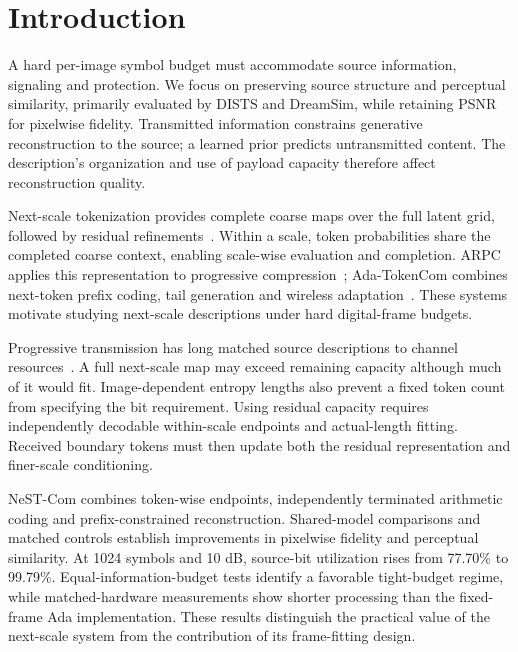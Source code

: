 \section{Introduction}
A hard per-image symbol budget must accommodate source information, signaling and protection. We focus on preserving source structure and perceptual similarity, primarily evaluated by DISTS and DreamSim, while retaining PSNR for pixelwise fidelity. Transmitted information constrains generative reconstruction to the source; a learned prior predicts untransmitted content. The description's organization and use of payload capacity therefore affect reconstruction quality.

Next-scale tokenization provides complete coarse maps over the full latent grid, followed by residual refinements~\cite{var}. Within a scale, token probabilities share the completed coarse context, enabling scale-wise evaluation and completion. ARPC applies this representation to progressive compression~\cite{arpc}; Ada-TokenCom combines next-token prefix coding, tail generation and wireless adaptation~\cite{adatokencom}. These systems motivate studying next-scale descriptions under hard digital-frame budgets.

Progressive transmission has long matched source descriptions to channel resources~\cite{chande}. A full next-scale map may exceed remaining capacity although much of it would fit. Image-dependent entropy lengths also prevent a fixed token count from specifying the bit requirement. Using residual capacity requires independently decodable within-scale endpoints and actual-length fitting. Received boundary tokens must then update both the residual representation and finer-scale conditioning.

NeST-Com combines token-wise endpoints, independently terminated arithmetic coding and prefix-constrained reconstruction. Shared-model comparisons and matched controls establish improvements in pixelwise fidelity and perceptual similarity. At 1024 symbols and 10 dB, source-bit utilization rises from 77.70\% to 99.79\%. Equal-information-budget tests identify a favorable tight-budget regime, while matched-hardware measurements show shorter processing than the fixed-frame Ada implementation. These results distinguish the practical value of the next-scale system from the contribution of its frame-fitting design.
